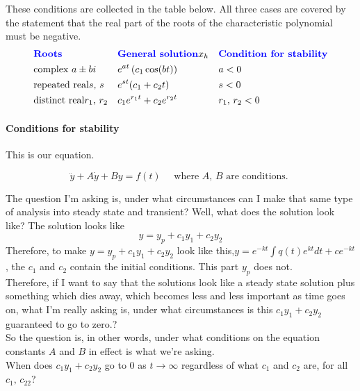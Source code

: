These conditions are collected in the table below.
All three cases are covered by the statement that the real part of the roots of
the characteristic polynomial must be negative.
\begin{align*}
  &\text{\textbf{\color{blue}Roots}}&
  &\text{\textbf{\color{blue}General solution}} x_ h &
  &\text{\textbf{\color{blue}Condition for stability}} \\
  &\text{complex } a \pm bi &
  &e^{at}\left(c_ 1 \cos (bt) \right)&
  & a < 0 \\
  &\text{repeated real} s,\, s &
  &e^{st} (c_ 1 + c_ 2 t)&
  &s < 0\\
  &\text{distinct real} r_ 1,\, r_ 2 & 
  & c_ 1 e^{r_ 1 t} + c_ 2 e^{r_ 2 t} &
  &r_ 1 , \, r_ 2 < 0 \\
\end{align*}

\paragraph{Conditions for stability}
This is our equation.

\begin{equation*}
  \ddot{y} + A \dot{y} + By =  f(t) \quad \text{ where } A, \, B \text{ are conditions. }
\end{equation*}

The question I'm asking is,
under what circumstances can I make that same type of analysis into steady state and transient?
Well, what does the solution look like?
The solution looks like
\begin{equation*}
  y = y_p + c_1 y_ 1 + c_ 2 y_ 2 
\end{equation*}
Therefore, to make $y = y_p + c_ 1 y_ 1 + c_ 2 y_ 2$ look like
this,$y = e^{-kt} \int q(t) e^{kt}dt + c e^{-kt}$,
the $c_ 1$ and $c_ 2$ contain the initial conditions.
This part $y_ p$ does not.\\
Therefore, if I want to say that the solutions look like a steady state solution
plus something which dies away, which becomes less and less important
as time goes on, what I'm really asking is, under what circumstances is this
$c_1 y_ 1 + c_ 2 y_ 2$ guaranteed to go to zero.?\\

So the question is, in other words, 
under what conditions on the equation constants $A$ and $B$ in effect
is what we're asking.\\
When does $c_ 1 y_ 1 + c_ 2 y_ 2$ go to $0$ as $t \to \infty$ regardless of what
$c_ 1$ and $c_ 2$ are, for all $c_ 1,\, c_22$?\\

